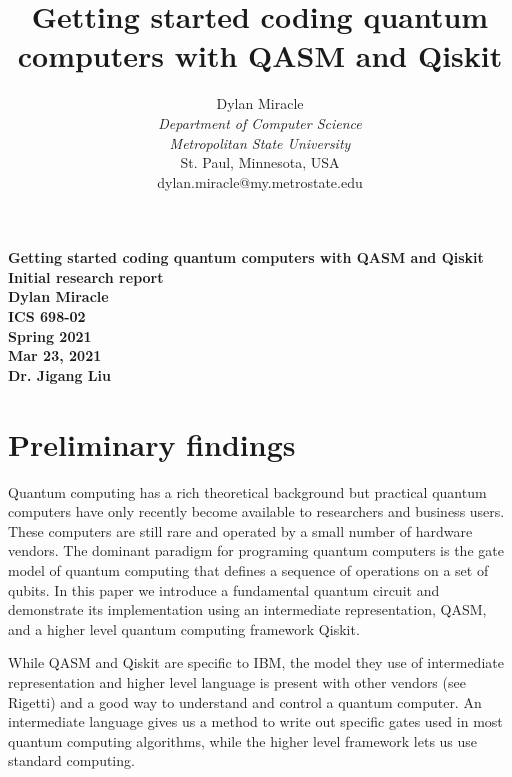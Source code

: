 \documentclass{article}
\begin{document}
\begin{titlepage}
    \begin{center}
        \vspace{4cm}
        \large
        \textbf{
            Getting started coding quantum computers with QASM and Qiskit \\
            Initial research report \\
            Dylan Miracle \\
            ICS 698-02 \\
            Spring 2021 \\
            Mar 23, 2021 \\
            Dr. Jigang Liu
        }
    \end{center}
\end{titlepage}
\title{Getting started coding quantum computers with QASM and Qiskit}

\author{Dylan Miracle\\
\textit{Department of Computer Science} \\
\textit{Metropolitan State University}\\
St. Paul, Minnesota, USA \\
dylan.miracle@my.metrostate.edu
}

\maketitle

\tableofcontents

\section{Preliminary findings}
Quantum computing has a rich theoretical background but practical quantum computers have only recently become available to researchers and business users. These computers are still rare and operated by a small number of hardware vendors. The dominant paradigm for programing quantum computers is the gate model of quantum computing that defines a sequence of operations on a set of qubits. In this paper we introduce a fundamental quantum circuit and demonstrate its implementation using an intermediate representation, QASM, and a higher level quantum computing framework Qiskit. 

While QASM and Qiskit are specific to IBM, the model they use of intermediate representation and higher level language is present with other vendors (see Rigetti) and a good way to understand and control a quantum computer. An intermediate language gives us a method to write out specific gates used in most quantum computing algorithms, while the higher level framework lets us use standard computing. 
\end{document}
